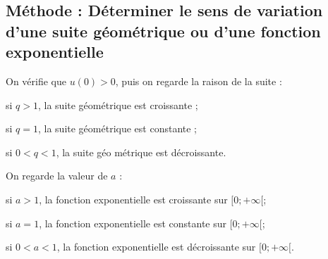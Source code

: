 \subsection{Méthode : Déterminer le sens de variation d'une suite géométrique ou d'une fonction exponentielle}

\begin{methode}
	\begin{enumMet}
		\item On vérifie que $u(0)>0$, puis on regarde la raison de la suite :
		\begin{itemMet}
			\item si $q>1$, la suite géométrique est croissante ;
			\item si $q=1$, la suite géométrique est constante ;
			\item si $0<q<1$, la suite géo métrique est décroissante.
		\end{itemMet}
		\item On regarde la valeur de $a$ :
		\begin{itemMet}
			\item si $a>1$, la fonction exponentielle est croissante sur $[0 ;+\infty[$;
			\item si $a=1$, la fonction exponentielle est constante sur $[0 ;+\infty[$;
			\item si $0<a<1$, la fonction exponentielle est décroissante sur $[0 ;+\infty[$.
		\end{itemMet}
	\end{enumMet}
\end{methode}

